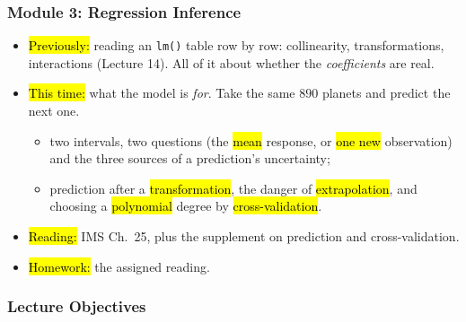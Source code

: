 

\begin{frame}
\frametitle{Module 3: Regression Inference}
    \begin{itemize}
        \item \hl{Previously:} reading an \texttt{lm()} table row by row: collinearity, transformations, interactions (Lecture 14). All of it about whether the \emph{coefficients} are real.
        \item \hl{This time:} what the model is \emph{for}. Take the same $890$ planets and predict the next one.
          \begin{itemize}
              \item two intervals, two questions (the \hl{mean} response, or \hl{one new} observation) and the three sources of a prediction's uncertainty;
              \item prediction after a \hl{transformation}, the danger of \hl{extrapolation}, and choosing a \hl{polynomial} degree by \hl{cross-validation}.
          \end{itemize}
        \item \hl{Reading:} IMS Ch.\ 25, plus the supplement on prediction and cross-validation.
        \item \hl{Homework:} the assigned reading.
    \end{itemize}
\end{frame}


\begin{frame}
    \frametitle{Lecture Objectives}
\end{frame}


